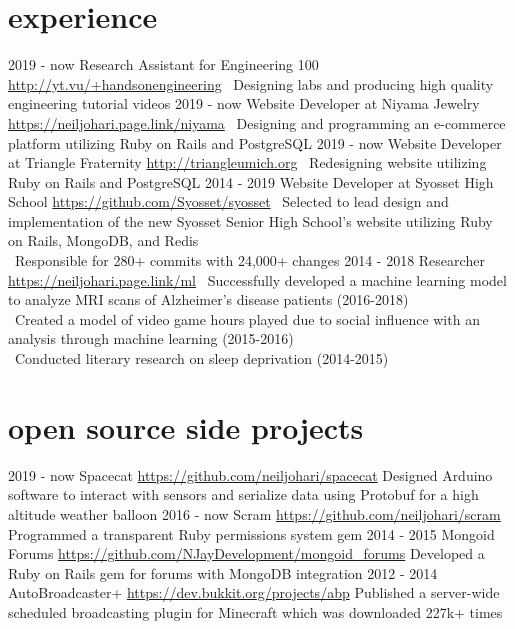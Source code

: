 \documentclass[]{friggeri-cv}
\begin{document}
\section{experience}
\begin{entrylist}
    \entry
    {2019 - now}
    {Research Assistant for Engineering 100}
    {\href{http://yt.vu/+handsonengineering}{http://yt.vu/+handsonengineering}}
    {\textendash \  Designing labs and producing high quality engineering tutorial videos} 
    \entry
    {2019 - now}
    {Website Developer at Niyama Jewelry}
    {\href{https://neiljohari.page.link/niyama}{https://neiljohari.page.link/niyama}}
    {\textendash \ Designing and programming an e-commerce platform utilizing Ruby on Rails and PostgreSQL}
    \entry
    {2019 - now}
    {Website Developer at Triangle Fraternity}
    {\href{http://triangleumich.org/}{http://triangleumich.org}}
    {\textendash \ Redesigning website utilizing Ruby on Rails and PostgreSQL}
    \entry
    {2014 - 2019}
    {Website Developer at Syosset High School}
    {\href{https://github.com/Syosset/syosset}{https://github.com/Syosset/syosset}}
    {\textendash \   Selected to lead design and implementation of the new Syosset Senior High School’s website utilizing Ruby on Rails, MongoDB, and Redis \\ 
        \textendash \   Responsible for 280+ commits with 24,000+ changes}  
    \entry
    {2014 - 2018}
    {Researcher}
    {\href{https://neiljohari.page.link/ml}{https://neiljohari.page.link/ml}}
    {\textendash \    Successfully developed a machine learning model to analyze MRI scans of Alzheimer’s disease patients (2016-2018) \\
     \textendash \    Created a model of video game hours played due to social influence with an analysis through machine learning (2015-2016) \\
     \textendash \    Conducted literary research on sleep deprivation (2014-2015)}
\end{entrylist} 

\section{open source side projects }
\begin{entrylist}
    \entry
    {2019 - now}
    {Spacecat}
    {\href{https://github.com/neiljohari/spacecat}{https://github.com/neiljohari/spacecat}}
    {Designed Arduino software to interact with sensors and serialize data using Protobuf for a high altitude weather balloon} 
    \entry
    {2016 - now}
    {Scram}
    {\href{https://github.com/neiljohari/scram}{https://github.com/neiljohari/scram}}
    {Programmed a transparent Ruby permissions system gem}
    \entry
    {2014 - 2015}
    {Mongoid Forums}
    {\href{https://github.com/NJayDevelopment/mongoid_forums}{https://github.com/NJayDevelopment/mongoid\_forums}}
    {Developed a Ruby on Rails gem for forums with MongoDB integration}
    \entry
    {2012 - 2014}
    {AutoBroadcaster+}
    {\href{https://dev.bukkit.org/projects/abp}{https://dev.bukkit.org/projects/abp}}
    {Published a server-wide scheduled broadcasting plugin for Minecraft which was downloaded 227k+ times}

\end{entrylist}
\end{document}
